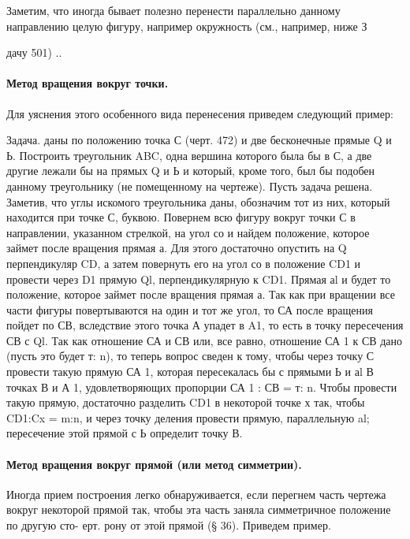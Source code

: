 Заметим, что иногда бывает полезно перенести параллельно данному направлению целую фигуру, например окружность (см., например, ниже З{дачу 501) ..

\paragraph{Метод вращения вокруг точки.}
Для уяснения этого особенного вида перенесения приведем следующий пример:

Задача. даны по положению точка С (черт. 472) и две бесконечные прямые Q и Ь. Построить треугольник ABC, одна вершина которого была бы в С, а две другие лежали бы на прямых Q и Ь и который, кроме того, был бы подобен данному треугольнику (не помещенному на чертеже).
Пусть задача решена.
Заметив, что углы искомого треугольника даны, обозначим тот из них, который находится при точке С, буквою. 
Повернем всю фигуру вокруг точки С в направлении, указанном стрелкой, на угол со и найдем положение, которое займет после вращения прямая а. 
Для этого достаточно опустить на Q перпендикуляр CD, а затем повернуть его на угол со в положение CD1 и провести через D1 прямую Ql, перпендикулярную к CD1.
Прямая аl и будет то положение, которое займет после вращения прямая а. 
Так как при вращении все части фигуры повертываются на один и тот же угол, то СА после вращения пойдет по СВ, вследствие этого точка А упадет в A1, то есть в точку пересечения СВ с Ql. 
Так как отношение СА и СВ или, все равно, отношение СА 1 к СВ дано (пусть это будет т: n), то теперь вопрос сведен к тому, чтобы через точку С провести такую прямую СА 1, которая пересекалась бы с прямыми Ь и аl В точках В и А 1, удовлетворяющих пропорции СА 1 : СВ = т: n. 
Чтобы провести такую   прямую,   достаточно   разделить
CD1 в некоторой точке х так, чтобы CD1:Cx = m:n, и через точку деления провести прямую, параллельную al; пересечение этой прямой с Ь определит точку В.

\paragraph{Метод  вращения   вокруг  прямой
(или метод симметрии).} Иногда прием
построения легко обнаруживается, если
перегнем часть чертежа вокруг некоторой
прямой  так,   чтобы  эта  часть  заняла
симметричное положение по другую сто-
ерт.                                                                                                                                                                                                                                                                                                                                                                                                                                                                                                                                                                          рону от этой прямой (§ 36). Приведем
пример.

}
